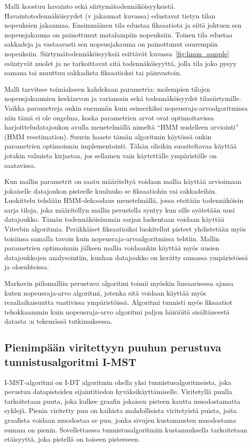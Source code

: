 Malli koostuu havainto sekä siirtymätodennäköisyyksistä. Havaintotodennäköisyydet (v jakaumat kuvassa) edustavat tietyn tilan nopeuksien jakaumaa. Ensimmäinen tila edustaa fiksaatiota ja siitä johtuen sen nopeusjakauma on painottunut matalampiin nopeuksiin. Toinen tila edustaa sakkadeja ja vastaavasti sen nopeusjakauma on painottunut suurempiin nopeuksiin. Siirtymätodennäköisyyksiä esittävät kuvassa~\ref{fig:hmm_sample} esiintyvät nuolet ja ne tarkoittavat sitä todennäköisyyttä, jolla tila joko pysyy samana tai muuttuu sakkadista fiksaatioksi tai päinvastoin.

Malli tarvitsee toimiakseen kahdeksan parametria: molempien tilojen nopeusjakaumien keskiarvon ja varianssin sekä todennäköisyydet tilasiirtymille. Vaikka parametreja onkin enemmän kuin esimerkiksi nopeusraja-arvoalgoritmissa niin tämä ei ole ongelma, koska parametrien arvot ovat optimoitavissa harjoitteludatajoukon avulla menetelmällä nimeltä ``HMM uudelleen arviointi'' (HMM reestimation).\citep[s. 180]{salvucci1999} Suurin haaste tämän algoritmin käytössä onkin parametrien optimoinnin implementointi. Tähän olisikin suositeltavaa käyttää jotakin valmista kirjastoa, jos sellainen vain käytettälle ympäristölle on saatavissa.

Kun mallin parametrit on saatu määriteltyä voidaan mallia käyttää arvioimaan jokaiselle datajoukon pisteelle kuuluuko se fiksaatiohin vai sakkadeihin. Luokittelu tehdään HMM-dekoodaus menetelmällä, jossa etsitään todennäköisin sarja tiloja, joka määritellyn mallin perustella syntyy kun sille syötetään uusi datajoukko. Tämän todennäköisimmän sarjan laskentaan voidaan käyttää Viterbin algoritmia.\citep[s. 178]{salvucci1999}  Peräkkäiset fiksaatioiksi luokitellut pisteet yhdistetään myös toisiinsa samalla tavoin kuin nopeusraja-arvoalgoritmissa tehtiin.\citep[s. 31]{salvucci1999} Mallin parametrien optimoinnin jälkeen mallia voidaankin käyttää myös uusien datajoukkojen analysointiin, kunhan datajoukko on kerätty samassa ympäristössä ja olosuhteissa.

Markovin piilomalliin perustuva algoritmi toimii myöskin lineaarisessa ajassa kuten nopeusraja-arvo algoritmi, jotenka sitä voidaan käyttää myös reaaliaikaisuutta vaativissa ympäristöissä. Algoritmi tunnisti myös fiksaatiot tehokkaammin kuin nopeusraja-arvo algoritmi paljon häiriöitä sisältäneestä datasta \citet[s. 32]{salvucci1999}:n tekemässä tutkimuksessa.

\subsection{Pienimpään viritettyyn puuhun perustuva tunnistusalgoritmi I-MST}
I-MST-algoritmi on I-DT algoritmin ohella yksi tunnistusalgoritmeista, joka perustuu datapisteiden sijaintitiedon hyväksikäyttämiselle. Viritetyllä puulla tarkoitetaan puuta, joka kulkee graafin jokaisen pisteen kautta muodostamatta syklejä. Pienin viritetty puu on kaikista mahdollisista viritetyistä puista, joita graafista voidaan muodostaa se puu, jonka sivujen kustannusten muodostama summa on pienin. Sovellettaessa tunnistusalgoritmiin kustannuksella tarkoitetaan etäisyyttä, joka pistellä on toiseen pisteeseen.

